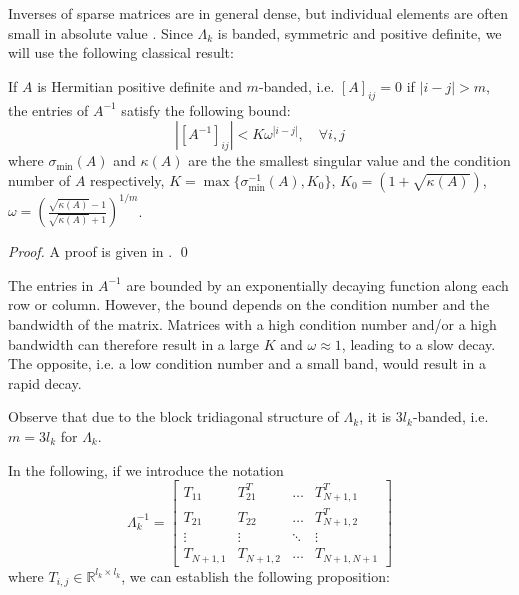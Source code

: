 Inverses of sparse matrices are in general dense, but individual elements are often small in absolute value \cite{Benzi2002}. Since $\Lambda_k$ is banded, symmetric and positive definite, we will use the following classical result:

\begin{lemma} \label{l:decay}
If $A$ is Hermitian positive definite and $m$-banded, i.e. $[A]_{ij} = 0$ if $|i-j| > m$, the entries of $A^{-1}$ satisfy the following bound:
\begin{equation}
|[A^{-1}]_{ij}| < K\omega^{|i-j|}, \quad \forall i,j
\end{equation}
where $\sigma_{\min}(A)$ and $\kappa(A)$ are the the smallest singular value and the condition number of $A$ respectively, $K = \max \{ \sigma_{\min}^{-1}(A), K_0 \}$, $K_0 = (1 + \sqrt{\kappa(A)})$, $\omega = \left( \frac{\sqrt{\kappa(A)} - 1}{\sqrt{\kappa(A)} + 1} \right)^{1/m}$.
\end{lemma}
\begin{proof}
A proof is given in \cite{Demko1986}. \qed
\end{proof}
\begin{remark}
The entries in $A^{-1}$ are bounded by an exponentially decaying function along each row or column. However, the bound depends on the condition number and the bandwidth of the matrix. Matrices with a high condition number and/or a high bandwidth can therefore result in a large $K$ and $\omega \approx 1$, leading to a slow decay. The opposite, i.e. a low condition number and a small band, would result in a rapid decay.
\end{remark}
\begin{remark}
Observe that due to the block tridiagonal structure of $\Lambda_k$, it is $3 l_k$-banded, i.e. $m = 3 l_k$ for $\Lambda_k$.
\end{remark}
In the following, if we introduce the notation
\begin{equation}
\Lambda_k^{-1} = \left[ \begin{array}{cccc}
T_{11} & T_{21}^T & \hdots & T_{N+1,1}^T \\
T_{21} & T_{22} & \hdots & T_{N+1,2}^T \\
\vdots & \vdots  & \ddots & \vdots \\
T_{N+1,1} & T_{N+1,2} & \hdots & T_{N+1,N+1}
\end{array} \right]
\end{equation}
where $T_{i,j} \in \mathbb{R}^{l_{k} \times l_{k}}$, we can establish the following proposition:


